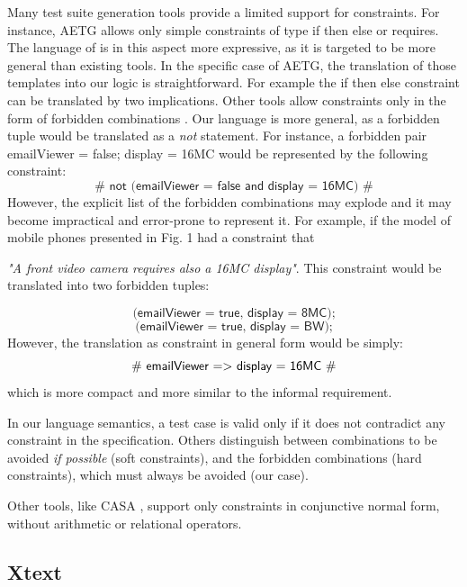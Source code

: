 \begin{tikzborder}{\cite{Gargantini16:validation}}
\begin{tikzborder}{\cite{gargantini_combinatorial_2017}}
\begin{tikzborder}{\cite{garn2019}}
\begin{tikzborder}{\cite{arcaini2019achieving}}
\begin{tikzborder}{}
Many test suite generation tools provide a limited support for constraints. For instance, AETG \cite{AETG,Lott2005} allows only simple constraints of type \textsf{if then else} or \textsf{requires}. The language of \ctwedge is in this aspect more expressive, as it is targeted to be more general than existing tools. In the specific case of AETG, the translation of those templates into our logic is straightforward. For example the \textsf{if then else} constraint can be translated by two implications.
Other tools \cite{CohenISSTA07} allow constraints only in the form of forbidden combinations \cite{Golumbic:2011:GTC:2028636}. Our language is more general, as a forbidden tuple would be translated as a \textit{not} statement. For instance, a forbidden pair \textsf{emailViewer = false; display = 16MC} would be represented by the following constraint:
$$\textsf{\#\ not\ (emailViewer = false\ and\ display = 16MC)\ \#}$$
However, the explicit list of the forbidden combinations may explode and it may become impractical and error-prone to represent it. For example, if the model of mobile phones presented in Fig. 1 had a constraint that

\emph{"A front video camera requires also a 16MC display"}. This constraint would be translated into two forbidden tuples:

$$\textsf{(emailViewer = true, display = 8MC);}$$
$$\textsf{(emailViewer = true, display = BW);}$$
However, the translation as constraint in general form would be simply:
$$\textsf{\#\ emailViewer =\textgreater\ display = 16MC\ \#}$$
which is more compact and more similar to the informal requirement.

In our language semantics, a test case is valid only if it does not contradict any constraint in the specification. Others \cite{BRYCE2006960} distinguish between combinations to be avoided \textit{if possible} (soft constraints), and the forbidden combinations (hard constraints), which must always be avoided (our case). %

Other tools, like CASA \cite{CASAwebsite}, support only constraints in conjunctive normal form, without arithmetic or relational operators.
\end{tikzborder}

\subsection{Xtext}


\end{tikzborder}
\end{tikzborder}
\end{tikzborder}
\end{tikzborder}
